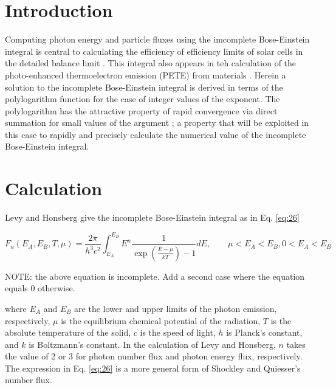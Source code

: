 \documentclass[letterpaper,12pt]{article}
\title{\Title}
\author{\AuthorName}
\begin{document}
\maketitle


\begin{abstract}

\end{abstract}


\section{Introduction}
Computing photon energy and particle fluxes using the imcomplete Bose-Einstein integral is central to calculating the efficiency of efficiency limits of solar cells in the detailed balance limit \cite{10.1063/1.1736034}. This integral also appears in teh calculation of the photo-enhanced thermoelectron emission (PETE) from materials \cite{10.1038/nmat2814}. Herein a solution to the incomplete Bose-Einstein integral is derived in terms of the polylogarithm function for the case of integer values of the exponent. The polylogarithm has the attractive property of rapid convergence via direct summation for small values of the argument \cite{http://academic.reed.edu/physics/faculty/crandall/papers/Polylog}; a property that will be exploited in this case to rapidly and precisely calculate the numerical value of the incomplete Bose-Einstein integral.


\section{Calculation}
Levy and Honsberg \cite{10.1016/j.sse.2006.06.017} give the incomplete Bose-Einstein integral as in Eq. \ref{eq:26}

\begin{equation} \label{eq:26}
F_{n}(E_{A},E_{B},T,\mu) = \frac{2 \pi}{h^{3}c^{2}} \int_{E_{A}}^{E_{B}} E^{n} \frac{1}{\exp \left( \frac{E - \mu}{kT} \right) - 1} dE, \qquad \mu < E_{A} < E_{B}, 0 < E_{A} < E_{B}
\end{equation}

NOTE: the above equation is incomplete. Add a second case where the equation equals 0 otherwise.

\noindent where $E_{A}$ and $E_{B}$ are the lower and upper limits of the photon emission, respectively, $\mu$ is the equilibrium chemical potential of the radiation, $T$ is the absolute temperature of the solid, $c$ is the speed of light, $h$ is Planck's constant, and $k$ is Boltzmann's constant. In the calculation of Levy and Honsberg, $n$ takes the value of 2 or 3 for photon number flux and photon energy flux, respectively. The expression in Eq. \ref{eq:26} is a more general form of Shockley and Quiesser's number flux.
\end{document}
